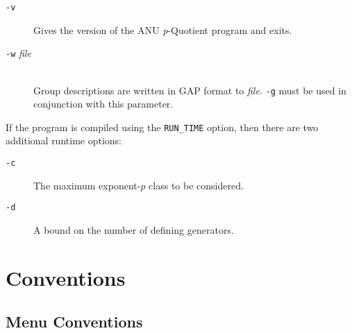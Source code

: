 \documentclass[12pt]{article}
\begin{document}
\begin{description}
\item[\texttt{-v}\hspace*{1em}]
      Gives the version of the ANU {\it p}-Quotient program and exits.

\item[\texttt{-w} {\it file}]\ \\
      Group descriptions are written in {\sf GAP} 
      format to {\em file}. \texttt{-g}
      must be used in conjunction with this parameter.

\end{description}

If the program is compiled using the \texttt{RUN\_TIME} option, then
there are two additional runtime options:

\begin{description}

\item[\texttt{-c}\hspace*{1em}]
The maximum exponent-$p$ class to be considered.

\item[\texttt{-d}\hspace*{1em}]
A bound on the number of defining generators.

\end{description}

\pagebreak
\section{Conventions}\label{sec:conventions}
\subsection{Menu Conventions}
\end{document}
